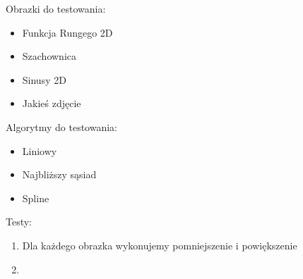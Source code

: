 \documentclass{article}
\begin{document}
Obrazki do testowania:
\begin{itemize}
  \item Funkcja Rungego 2D
  \item Szachownica
  \item Sinusy 2D
  \item Jakieś zdjęcie
\end{itemize}

Algorytmy do testowania:
\begin{itemize}
  \item Liniowy
  \item Najbliższy sąsiad
  \item Spline
\end{itemize}


Testy:
\begin{enumerate}
  \item Dla każdego obrazka wykonujemy pomniejszenie i powiększenie
  \item  
\end{enumerate}
\end{document}
